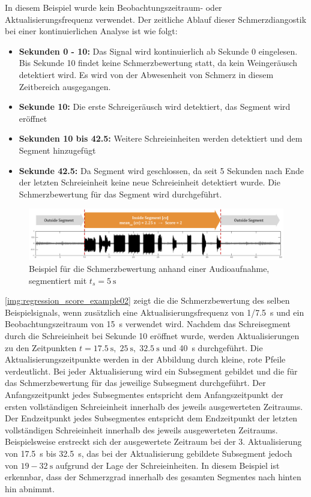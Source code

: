 In diesem Beispiel wurde kein Beobachtungszeitraum- oder Aktualisierungsfrequenz verwendet. Der zeitliche Ablauf dieser Schmerzdiangostik bei einer kontinuierlichen Analyse ist wie folgt:
\begin{itemize}
	\item \textbf{Sekunden 0 - 10:} Das Signal wird kontinuierlich ab Sekunde 0 eingelesen. Bis Sekunde 10 findet keine Schmerzbewertung statt, da kein Weingeräusch detektiert wird. Es wird von der Abwesenheit von Schmerz in diesem Zeitbereich ausgegangen.
	\item \textbf{Sekunde 10:} Die erste Schreigeräusch wird detektiert, das Segment wird eröffnet
	\item \textbf{Sekunden 10 bis 42.5:} Weitere Schreieinheiten werden detektiert und dem Segment hinzugefügt
	\item \textbf{Sekunde 42.5:} Da Segment wird geschlossen, da seit 5 Sekunden nach Ende der letzten Schreieinheit keine neue Schreieinheit detektiert wurde. Die Schmerzbewertung für das Segment wird durchgeführt.
\end{itemize}

\begin{figure}[h]
	\centering
	\includegraphics[width=1\textwidth]{bilder/regression_score_example_06.png}
	\caption[Beispiel für die Schmerzbewertung anhand einer Audioaufnahme]{Beispiel für die Schmerzbewertung anhand einer Audioaufnahme, segmentiert mit $t_s = \SI{5}{\second}$}
	\label{img:regression_score_example01}
\end{figure}


\autoref{img:regression_score_example02} zeigt die die Schmerzbewertung des selben Beispielsignals, wenn zusätzlich eine Aktualisierungsfrequenz von \SI{1/7.5}{\second} und ein Beobachtungszeitraum von \SI{15}{\second} verwendet wird. Nachdem das Schreisegment durch die Schreieinheit bei Sekunde 10 eröffnet wurde, werden Aktualisierungen zu den Zeitpunkten $t = \SI{17.5}{\second},\; \SI{25}{\second},\; \SI{32.5}{\second}$ und \SI{40}{\second} durchgeführt. Die Aktualisierungszeitpunkte werden in der Abbildung durch kleine, rote Pfeile verdeutlicht. Bei jeder Aktualisierung wird ein Subsegment gebildet und die für das Schmerzbewertung für das jeweilige Subsegment durchgeführt. Der Anfangszeitpunkt jedes Subsegmentes entspricht dem Anfangszeitpunkt der ersten vollständigen Schreieinheit innerhalb des jeweils ausgewerteten Zeitraums. Der Endzeitpunkt jedes Subsegmentes entspricht dem Endzeitpunkt der letzten vollständigen Schreieinheit innerhalb des jeweils ausgewerteten Zeitraums. Beispielsweise erstreckt sich der ausgewertete Zeitraum bei der 3. Aktualisierung von \SI{17.5}{\second} bis \SI{32.5}{\second}, das bei der Aktualisierung gebildete Subsegment jedoch von $19 - \SI{32}{\second}$ aufgrund der Lage der Schreieinheiten. In diesem Beispiel ist erkennbar, dass der Schmerzgrad innerhalb des gesamten Segmentes nach hinten hin abnimmt.

